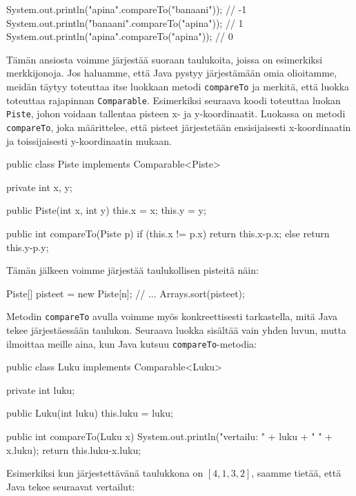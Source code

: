 \begin{code}
System.out.println("apina".compareTo("banaani")); // -1
System.out.println("banaani".compareTo("apina")); // 1
System.out.println("apina".compareTo("apina")); // 0
\end{code}

Tämän ansiosta voimme järjestää suoraan taulukoita,
joissa on esimerkiksi merkkijonoja.
Jos haluamme, että Java pystyy järjestämään omia olioitamme,
meidän täytyy toteuttaa itse luokkaan metodi \texttt{compareTo} ja
merkitä, että luokka toteuttaa rajapinnan \texttt{Comparable}.
Esimerkiksi seuraava koodi toteuttaa luokan \texttt{Piste},
johon voidaan tallentaa pisteen x- ja y-koordinaatit.
Luokassa on metodi \texttt{compareTo}, joka määrittelee,
että pisteet järjestetään ensisijaisesti x-koordinaatin ja
toissijaisesti y-koordinaatin mukaan.

\begin{code}
public class Piste implements Comparable<Piste> {
    private int x, y;
    
    public Piste(int x, int y) {
        this.x = x;
        this.y = y;
    }

    public int compareTo(Piste p) {
        if (this.x != p.x) {
            return this.x-p.x;
        } else {
            return this.y-p.y;
        }
    }
}
\end{code}

Tämän jälkeen voimme järjestää taulukollisen pisteitä näin:

\begin{code}
Piste[] pisteet = new Piste[n];
// ...
Arrays.sort(pisteet);
\end{code}

Metodin \texttt{compareTo} avulla voimme myös konkreettisesti
tarkastella, mitä Java tekee järjestäessään taulukon.
Seuraava luokka sisältää vain yhden luvun,
mutta ilmoittaa meille aina, kun Java kutsuu
\texttt{compareTo}-metodia:

\begin{code}
public class Luku implements Comparable<Luku> {
    private int luku;
    
    public Luku(int luku) {
        this.luku = luku;
    }

    public int compareTo(Luku x) {
        System.out.println("vertailu: " + luku + " " + x.luku);
        return this.luku-x.luku;
    }
}
\end{code}

Esimerkiksi kun järjestettävänä taulukkona on $[4,1,3,2]$,
saamme tietää, että Java tekee seuraavat vertailut:

